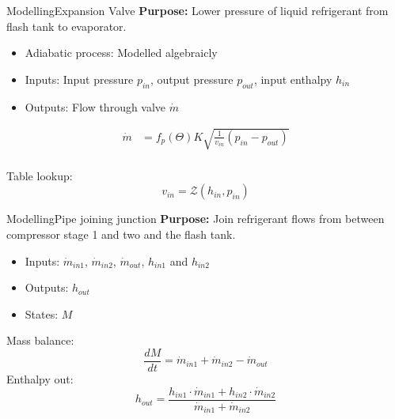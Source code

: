 \begin{frame}{Modelling}{Expansion Valve}
	\textbf{Purpose:} Lower pressure of liquid refrigerant from flash tank to evaporator.
	\begin{itemize}
		\item Adiabatic process: Modelled algebraicly
		\item Inputs: Input pressure $p_{in}$, output pressure $p_{out}$, input enthalpy $h_{in}$
		\item Outputs: Flow through valve $\dot{m}$
	\end{itemize}
	
	\begin{equation} \label{eq:ExpansionValve_Alt}
		\begin{split}
			\dot{m} & = f_p(\Theta) K  \sqrt{\frac{1}{v_{in}} (p_{in} - p_{out})} \\
		\end{split}
	\end{equation}

	Table lookup:
	\begin{equation} \label{eq:ExpansionValve_vin}
		v_{in} = \mathcal{Z}(h_{in}, p_{in})
	\end{equation}
\end{frame}




\begin{frame}{Modelling}{Pipe joining junction}
	\textbf{Purpose:} Join refrigerant flows from between compressor stage 1 and two and the flash tank.
	\begin{itemize}
		\item Inputs: $\dot{m}_{in1}$, $\dot{m}_{in2}$, $\dot{m}_{out}$, $h_{in1}$ and $h_{in2}$
		\item Outputs: $h_{out}$
		\item States: $M$
	\end{itemize}
Mass balance:
	\begin{equation}
		 \frac{dM}{dt} = \dot{m}_{in1} + \dot{m}_{in2} - \dot{m}_{out}       \label{eq:PipeJoiningJunction_ChangeOfMass}
	\end{equation}
Enthalpy out:
\begin{equation} \label{eq:PipeJoiningJunction_Enthalpy}
	h_{out} = \frac{h_{in1} \cdot \dot{m}_{in1} + h_{in2} \cdot \dot{m}_{in2}}{ \dot{m}_{in1} + \dot{m}_{in2} }
\end{equation}
	
\end{frame}




